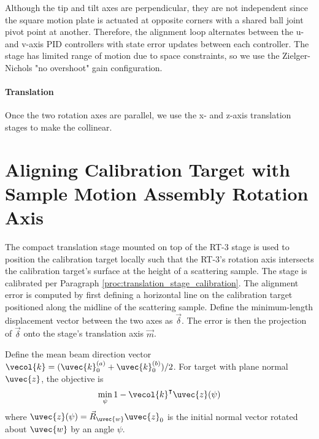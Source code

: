 Although the tip and tilt axes are perpendicular, they are not independent since the square motion plate is actuated at opposite corners with a shared ball joint pivot point at another. Therefore, the alignment loop alternates between the u- and v-axis PID controllers with state error updates between each controller. The stage has limited range of motion due to space constraints, so we use the Zielger-Nichols "no overshoot" gain configuration.

\paragraph{Translation} Once the two rotation axes are parallel, we use the x- and z-axis translation stages to make the collinear. 


\section{Aligning Calibration Target with Sample Motion Assembly Rotation Axis} %
The compact translation stage mounted on top of the RT-3 stage is used to position the calibration target locally such that the RT-3's rotation axis intersects the calibration target's surface at the height of a scattering sample. The stage is calibrated per Paragraph \ref{proc:translation_stage_calibration}. The alignment error is computed by first defining a horizontal line on the calibration target positioned along the midline of the scattering sample. Define the minimum-length displacement vector between the two axes as $\vec{\delta}$. The error is then the projection of $\vec{\delta}$ onto the stage's translation axis $\vec{m}$.

Define the mean beam direction vector $\vecol{k} = (\uvec{k}^{(a)}_0 + \uvec{k}^{(b)}_0)/2$. For target with plane normal $\uvec{z}$, the objective is
\begin{equation}
    \min_{\psi} 1 - \vecol{k}^\intercal \uvec{z}(\psi)
\end{equation}
where $\uvec{z}(\psi) = \vec{R}_{\uvec{w}} \uvec{z}_0$ is the initial normal vector rotated about $\uvec{w}$ by an angle $\psi$.

